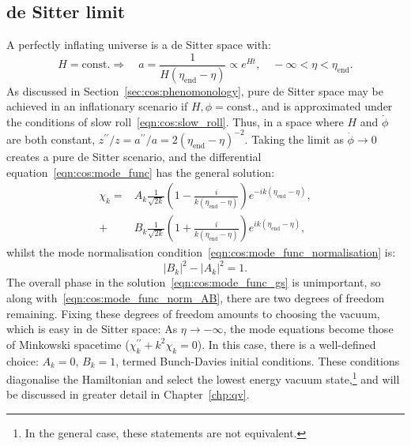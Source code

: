 \subsection{de Sitter limit}
A perfectly inflating universe is a de Sitter space with:
\begin{equation}
  H=\text{const.}\Rightarrow \quad a = \frac{1}{H(\eta_\mathrm{end}-\eta)} \propto e^{Ht}, \quad -\infty<\eta<\eta_\mathrm{end}.
  \label{eqn:cos:de_sitter}
\end{equation}
As discussed in Section~\ref{sec:cos:phenomonology}, pure de Sitter space may be achieved in an inflationary scenario if \(H,\phi=\mathrm{const.}\), and is approximated under the conditions of slow roll~\eqref{eqn:cos:slow_roll}. 
Thus, in a space where \(H\) and \(\dot\phi\) are both constant, \({z^{\prime\prime}/z = a^{\prime\prime}/a = 2{(\eta_\mathrm{end}-\eta)}^{-2}}\). Taking the limit as \(\dot{\phi}\to0\) creates a pure de Sitter scenario, and the differential equation~\eqref{eqn:cos:mode_func} has the general solution:
\begin{align}
  \chi_k = &A_k \frac{1}{\sqrt{2k}}\left( 1-\frac{i}{k(\eta_\mathrm{end}-\eta)} \right)e^{-ik(\eta_\mathrm{end}-\eta)}, \nonumber\\
  + &B_k \frac{1}{\sqrt{2k}}\left( 1+\frac{i}{k(\eta_\mathrm{end}-\eta)} \right)e^{ik(\eta_\mathrm{end}-\eta)},
  \label{eqn:cos:mode_func_gs}
\end{align}
whilst the mode normalisation condition~\eqref{eqn:cos:mode_func_normalisation} is:
\begin{equation}
  |B_k|^2 - |A_k|^2 = 1.
  \label{eqn:cos:mode_func_norm_AB}
\end{equation}
The overall phase in the solution~\eqref{eqn:cos:mode_func_gs} is unimportant, so along with~\eqref{eqn:cos:mode_func_norm_AB}, there are two degrees of freedom remaining. Fixing these degrees of freedom amounts to choosing the vacuum, which is easy in de Sitter space: As \(\eta\rightarrow -\infty\), the mode equations become those of Minkowski spacetime (\(\chi_k^{\prime\prime} +k^2 \chi_k=0\)). In this case, there is a well-defined choice: \(A_k=0\), \(B_k=1\), termed Bunch-Davies initial conditions. These conditions diagonalise the Hamiltonian and select the lowest energy vacuum state,\footnote{In the general case, these statements are not equivalent.} and will be discussed in greater detail in Chapter~\ref{chp:qv}.

